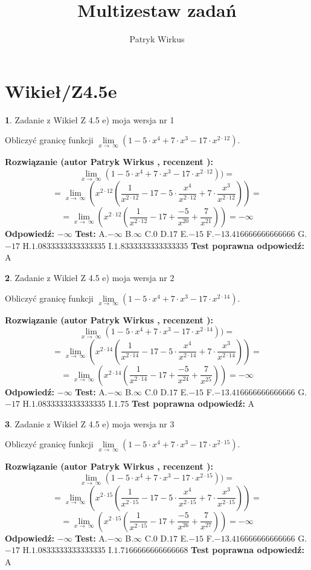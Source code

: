 \documentclass[12pt, a4paper]{article}
\title{Multizestaw zadań}
\author{Patryk Wirkus}
\date{}
\theoremstyle{definition} %
\newtheorem{zad}{}
\newcommand{\kategoria}[1]{\section{#1}}
\newcommand{\zadStart}[1]{\begin{zad}#1\newline}
\newcommand{\zadStop}{\end{zad}}
\newcommand{\rozwStart}[2]{\noindent \textbf{Rozwiązanie (autor #1 , recenzent #2): }\newline}
\newcommand{\rozwStop}{\newline}
\newcommand{\odpStart}{\noindent \textbf{Odpowiedź:}\newline}
\newcommand{\odpStop}{\newline}
\newcommand{\testStart}{\noindent \textbf{Test:}\newline}
\newcommand{\testStop}{\newline}
\newcommand{\kluczStart}{\noindent \textbf{Test poprawna odpowiedź:}\newline}
\newcommand{\kluczStop}{\newline}
\begin{document}
\maketitle

\kategoria{Wikieł/Z4.5e}


\zadStart{Zadanie z Wikieł Z 4.5 e) moja wersja nr 1}


Obliczyć granicę funkcji  $\lim\limits_{x\to\ \infty}(1 - 5 \cdot x^{4}+7 \cdot x^{3}- 17 \cdot x^{2\cdot12})$.
\zadStop
\rozwStart{Patryk Wirkus}{}
$$\lim\limits_{x\to\ \infty}(1 - 5 \cdot x^{4}+7 \cdot x^{3}- 17 \cdot x^{2\cdot12}))=$$
$$=\lim\limits_{x\to\ \infty}(x^{2\cdot12}(\frac{1}{x^{2\cdot12}}-17 -5 \cdot \frac{x^{4}}{x^{2\cdot12}}+7 \cdot \frac{x^{3}}{x^{2\cdot12}}))=$$
$$=\lim\limits_{x\to\ \infty}(x^{2\cdot12}(\frac{1}{x^{2\cdot12}}-17 + \frac{-5}{x^{20}}+ \frac{7}{x^{21}}))=-\infty$$
\rozwStop
\odpStart
$-\infty$
\odpStop
\testStart
A.$-\infty$ B.$\infty$ C.$0$ D.$17$ E.$-15$
F.$-13.416666666666666$ G.$-17$
H.$1.0833333333333335$
I.$1.8333333333333335$
\testStop
\kluczStart
A
\kluczStop



\zadStart{Zadanie z Wikieł Z 4.5 e) moja wersja nr 2}


Obliczyć granicę funkcji  $\lim\limits_{x\to\ \infty}(1 - 5 \cdot x^{4}+7 \cdot x^{3}- 17 \cdot x^{2\cdot14})$.
\zadStop
\rozwStart{Patryk Wirkus}{}
$$\lim\limits_{x\to\ \infty}(1 - 5 \cdot x^{4}+7 \cdot x^{3}- 17 \cdot x^{2\cdot14}))=$$
$$=\lim\limits_{x\to\ \infty}(x^{2\cdot14}(\frac{1}{x^{2\cdot14}}-17 -5 \cdot \frac{x^{4}}{x^{2\cdot14}}+7 \cdot \frac{x^{3}}{x^{2\cdot14}}))=$$
$$=\lim\limits_{x\to\ \infty}(x^{2\cdot14}(\frac{1}{x^{2\cdot14}}-17 + \frac{-5}{x^{24}}+ \frac{7}{x^{25}}))=-\infty$$
\rozwStop
\odpStart
$-\infty$
\odpStop
\testStart
A.$-\infty$ B.$\infty$ C.$0$ D.$17$ E.$-15$
F.$-13.416666666666666$ G.$-17$
H.$1.0833333333333335$
I.$1.75$
\testStop
\kluczStart
A
\kluczStop



\zadStart{Zadanie z Wikieł Z 4.5 e) moja wersja nr 3}


Obliczyć granicę funkcji  $\lim\limits_{x\to\ \infty}(1 - 5 \cdot x^{4}+7 \cdot x^{3}- 17 \cdot x^{2\cdot15})$.
\zadStop
\rozwStart{Patryk Wirkus}{}
$$\lim\limits_{x\to\ \infty}(1 - 5 \cdot x^{4}+7 \cdot x^{3}- 17 \cdot x^{2\cdot15}))=$$
$$=\lim\limits_{x\to\ \infty}(x^{2\cdot15}(\frac{1}{x^{2\cdot15}}-17 -5 \cdot \frac{x^{4}}{x^{2\cdot15}}+7 \cdot \frac{x^{3}}{x^{2\cdot15}}))=$$
$$=\lim\limits_{x\to\ \infty}(x^{2\cdot15}(\frac{1}{x^{2\cdot15}}-17 + \frac{-5}{x^{26}}+ \frac{7}{x^{27}}))=-\infty$$
\rozwStop
\odpStart
$-\infty$
\odpStop
\testStart
A.$-\infty$ B.$\infty$ C.$0$ D.$17$ E.$-15$
F.$-13.416666666666666$ G.$-17$
H.$1.0833333333333335$
I.$1.7166666666666668$
\testStop
\kluczStart
A
\kluczStop
\end{document}
